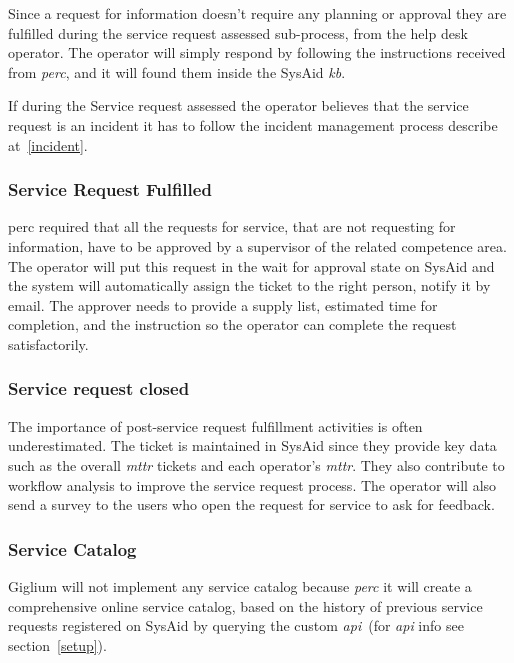 Since a request for information doesn't require any planning or approval they are fulfilled during the service request assessed sub-process, from the help desk operator. The operator will simply respond by following the instructions received from \textit{\gls{perc}}, and it will found them inside the SysAid \textit{\gls{kb}}.

\begin{tcolorbox}
	If during the Service request assessed the operator believes that the service request is an incident it has to follow the incident management process describe at~\ref{incident}.
\end{tcolorbox}

\subsubsection{Service Request Fulfilled}
\gls{perc} required that all the requests for service, that are not requesting for information, have to be approved by a supervisor of the related competence area. The operator will put this request in the wait for approval state on SysAid and the system will automatically assign the ticket to the right person, notify it by email. The approver needs to provide a supply list, estimated time for completion, and the instruction so the operator can complete the request satisfactorily.

\subsubsection{Service request closed}
The importance of post-service request fulfillment activities is often underestimated. The ticket is maintained in SysAid since they provide key data such as the overall \textit{\gls{mttr}} tickets and each operator's \textit{\gls{mttr}}. They also contribute to workflow analysis to improve the service request process. The operator will also send a survey to the users who open the request for service to ask for feedback.

\subsubsection{Service Catalog}
Giglium will not implement any service catalog because \textit{\gls{perc}} it will create a comprehensive online service catalog, based on the history of previous service requests registered on SysAid by querying the custom \textit{\gls{api}}~(for \textit{\gls{api}} info see section~\ref{setup}).

